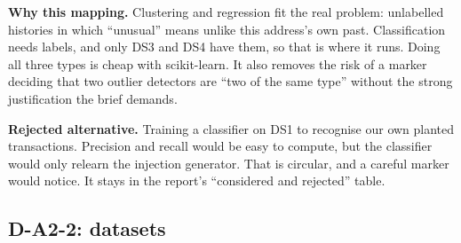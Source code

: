 \textbf{Why this mapping.} Clustering and regression fit the real problem: unlabelled histories in
which ``unusual'' means unlike this address's own past. Classification needs labels, and only
DS3 and DS4 have them, so that is where it runs. Doing all three types is cheap with scikit-learn.
It also removes the risk of a marker deciding that two outlier detectors are ``two of the same
type'' without the strong justification the brief demands.

\textbf{Rejected alternative.} Training a classifier on DS1 to recognise our own planted
transactions. Precision and recall would be easy to compute, but the classifier would only
relearn the injection generator. That is circular, and a careful marker would notice. It stays in
the report's ``considered and rejected'' table.

\subsection{D-A2-2: datasets}
\label{sec:datasets}

